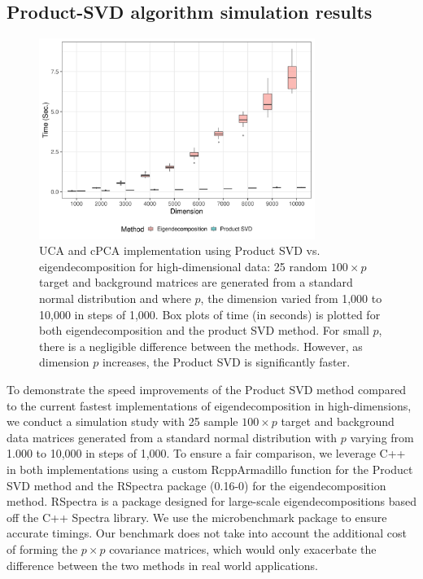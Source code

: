 \documentclass[12pt]{article}
\begin{document}
\subsection{\label{sec:product-svd} Product-SVD algorithm simulation results}
\begin{figure}[!ht]
  \centering
  \includegraphics[width = 0.8\textwidth]{figure/final_perf.png}
  \caption{UCA and cPCA implementation using Product SVD vs. eigendecomposition for high-dimensional data: 25 random $100 \times p $ target and background matrices are generated from a standard normal distribution and where $p$, the dimension varied from 1,000 to 10,000 in steps of 1,000. Box plots of time (in seconds) is plotted for both eigendecomposition and the product SVD method. For small $p$, there is a negligible difference between the methods. However, as dimension $p$ increases, the Product SVD is significantly faster.}
  \label{fig:computational_perf}
\end{figure}
To demonstrate the speed improvements of the Product SVD method compared to the current fastest implementations of eigendecomposition in high-dimensions, we conduct a simulation study with 25 sample $100 \times p$ target and background data matrices generated from a standard normal distribution with $p$ varying from 1.000 to 10,000 in steps of 1,000. To ensure a fair comparison, we leverage C++ in both implementations using a custom RcppArmadillo \cite{rcpparmadillo} function for the Product SVD method and the RSpectra package (0.16-0) \cite{Rspectra} for the eigendecomposition method. RSpectra is a package designed for large-scale eigendecompositions based off the C++ Spectra library. We use the microbenchmark package \cite{microbenchmark} to ensure accurate timings. Our benchmark does not take into account the additional cost of forming the $p\times p$ covariance matrices, which would only exacerbate the difference between the two methods in real world applications.
\end{document}
